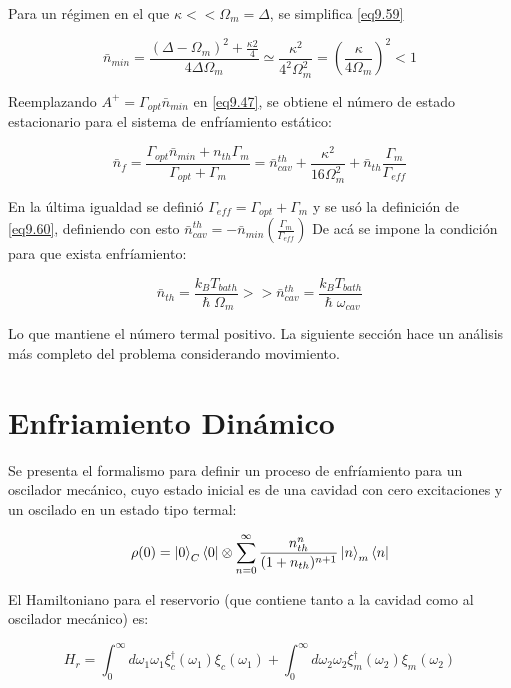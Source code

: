 \documentclass{book}
\begin{document}
Para un régimen en el que $\kappa << \Omega_m=\Delta$, se simplifica \ref{eq9.59}

\begin{equation}\label{eq9.60}\bar{n}_{min}=\frac{(\Delta-\Omega_m)^2+\frac{\kappa 2}{4}}{4\Delta\Omega_m}\simeq \frac{\kappa^2}{4^2\Omega_m^2}=(\frac{\kappa}{4\Omega_m})^2<1\end{equation}

Reemplazando $A^+=\Gamma_{opt}\bar{n}_{min}$ en \ref{eq9.47}, se obtiene el número de estado estacionario para el sistema de enfríamiento estático:

\begin{equation}\label{eq9.61}\bar{n}_f=\frac{\Gamma_{opt}\bar{n}_{min}+n_{th}\Gamma_m}{\Gamma_{opt}+\Gamma_m}=\bar{n}^{th}_{cav}+\frac{\kappa^2}{16\Omega^2_m}+\bar{n}_{th}\frac{\Gamma_m}{\Gamma_{eff}}\end{equation}

En la última igualdad se definió $\Gamma_{eff}=\Gamma_{opt}+\Gamma_m$ y se usó la definición de \ref{eq9.60}, definiendo con esto $\bar{n}^{th}_{cav}=-\bar{n}_{min}(\frac{\Gamma_{m}}{\Gamma_{eff}})$ De acá se impone la condición para que exista enfríamiento:

\begin{equation}\label{eq9.62}\bar{n}_{th}=\frac{k_BT_{bath}}{\hslash\Omega_m}>>\bar{n}_{cav}^{th}=\frac{k_BT_{bath}}{\hslash\omega_{cav}}\end{equation}

Lo que mantiene el número termal positivo. La siguiente sección hace un análisis más completo del problema considerando movimiento.

\section{Enfriamiento Dinámico}

Se presenta el formalismo para definir un proceso de enfríamiento para un oscilador mecánico, cuyo estado inicial es de una cavidad con cero excitaciones y un oscilado en un estado tipo termal:

\begin{equation}\label{eq9.63}\rho(0)=\ket{0}_C\bra{0}\otimes\sum_{n=0}^\infty\frac{n_{th}^n}{(1+n_{th})^{n+1}}\ket{n}_m\bra{n}\end{equation}

El Hamiltoniano para el reservorio (que contiene tanto a la cavidad como al oscilador mecánico) es:

\begin{equation}\label{eq9.64}H_r=\int_0^\infty d\omega_1\omega_1\xi_c^\dag(\omega_1)\xi_c(\omega_1)+\int_0^\infty d\omega_2\omega_2\xi_m^\dag(\omega_2)\xi_m(\omega_2)\end{equation}
\end{document}
